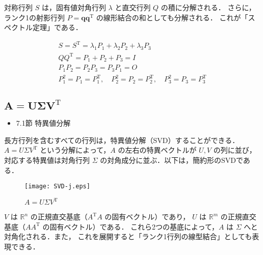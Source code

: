 \documentclass[letterpaper]{article}
\DeclareRobustCommand\transp{^{\mathrm{T}}}
\begin{document}
対称行列 $S$ は，固有値対角行列 $\lambda$ と直交行列 $Q$ の積に分解される．
さらに，ランク1の射影行列 $P=\bm{q}\bm{q}\transp$ の線形結合の和としても分解される．
これが「スペクトル定理」である．

\begin{gather*}
  S=S\transp = \lambda_1 P_1 + \lambda_2 P_2 + \lambda_3 P_3\\
  QQ\transp = P_1 + P_2 + P_3 = I \\
  P_1 P_2 = P_2 P_3 = P_3 P_1 = O\\
  P_1^2 =P_1=P_1\transp, \quad P_2^2=P_2=P_2\transp, \quad P_3^2=P_3=P_3\transp
\end{gather*}

\subsection{$\boldsymbol{A=U \Sigma V\transp}$}

\begin{itemize}
  \item 7.1節 特異値分解
\end{itemize}

長方行列を含むすべての行列は，特異値分解（SVD）することができる．
$A=U \Sigma V\transp$ という分解によって，$A$ の左右の特異ベクトルが $U, V$ の列に並び，
対応する特異値は対角行列 $\Sigma$ の対角成分に並ぶ．以下は，簡約形のSVDである．

\begin{figure}[H]
  \centering
  \texttt{[image: SVD-j.eps]}
  \caption{$A=U \Sigma V\transp$}
\end{figure}

$V$ は $\mathbb{R}^n$ の正規直交基底（$A\transp A$ の固有ベクトル）であり，
$U$ は $\mathbb{R}^m$ の正規直交基底（$AA\transp$ の固有ベクトル）である．
これら2つの基底によって，$A$ は $\Sigma$ へと対角化される．また，
これを展開すると「ランク1行列の線型結合」としても表現できる．
\end{document}
